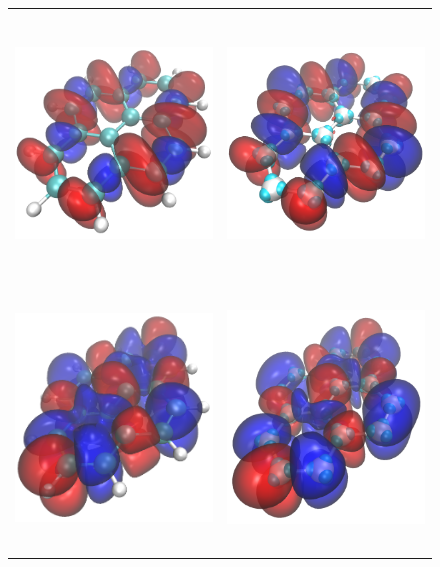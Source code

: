 \documentclass[12pt]{article}
\begin{document}
\begin{figure}
\begin{tabular}{|c|c|}
\hline
\includegraphics[width=7cm, height=7cm]{pyrene_peak1_ref_white} &
\includegraphics[width=7cm, height=7cm]{pyrene_peak1_ps_white} \\
\includegraphics[width=7cm, height=7cm]{pyrene_peak2_ref_white} &
\includegraphics[width=7cm, height=7cm]{pyrene_peak2_ps_white} \\

\end{tabular}
\end{figure}
\end{document}
